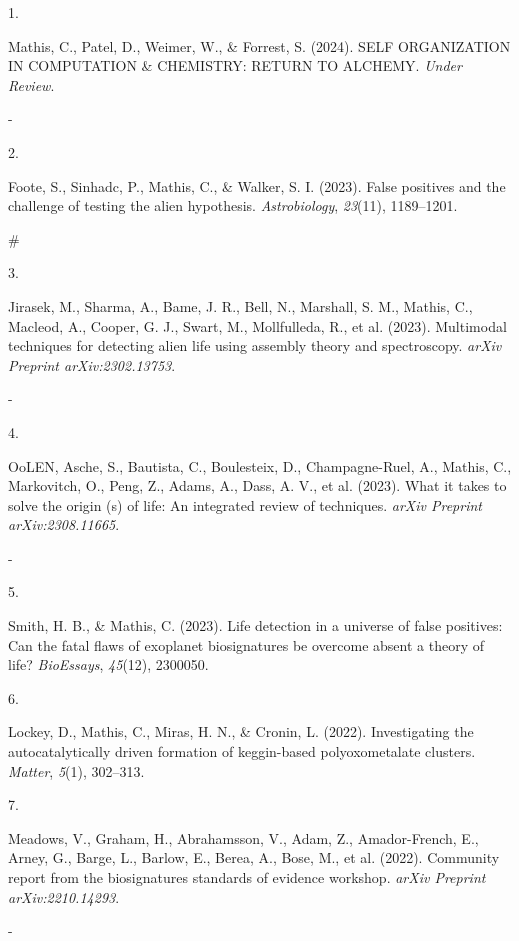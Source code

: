 \documentclass[11pt,a4paper,]{awesome-cv}
\newlength{\cslhangindent}
\newlength{\csllabelwidth}
\newenvironment{CSLReferences}[2] %
 {\begin{list}{}{%
  \setlength{\itemindent}{0pt}
  \setlength{\leftmargin}{0pt}
  \setlength{\parsep}{0pt}
  \ifodd #1
   \setlength{\leftmargin}{\cslhangindent}
   \setlength{\itemindent}{-1\cslhangindent}
  \fi
  \setlength{\itemsep}{#2\baselineskip}}}
 {\end{list}}
\newcommand{\CSLBlock}[1]{\hfill\break\parbox[t]{\linewidth}{\strut\ignorespaces#1\strut}}
\newcommand{\CSLLeftMargin}[1]{\parbox[t]{\csllabelwidth}{\strut#1\strut}}
\newcommand{\CSLRightInline}[1]{\parbox[t]{\linewidth - \csllabelwidth}{\strut#1\strut}}
\begin{document}
\label{refs-1797e7d470caf82193c45094f2f30c28}
\begin{CSLReferences}{0}{0}
\CSLLeftMargin{1. }%
\CSLRightInline{Mathis, C., Patel, D., Weimer, W., \& Forrest, S.
(2024). SELF ORGANIZATION IN COMPUTATION \& CHEMISTRY: RETURN TO
ALCHEMY. \emph{Under Review}.
\CSLBlock{-}}

\CSLLeftMargin{2. }%
\CSLRightInline{Foote, S., Sinhadc, P., Mathis, C., \& Walker, S. I.
(2023). False positives and the challenge of testing the alien
hypothesis. \emph{Astrobiology}, \emph{23}(11), 1189--1201.
\CSLBlock{\#}}

\CSLLeftMargin{3. }%
\CSLRightInline{Jirasek, M., Sharma, A., Bame, J. R., Bell, N.,
Marshall, S. M., Mathis, C., Macleod, A., Cooper, G. J., Swart, M.,
Mollfulleda, R., et al. (2023). Multimodal techniques for detecting
alien life using assembly theory and spectroscopy. \emph{arXiv Preprint
arXiv:2302.13753}.
\CSLBlock{-}}

\CSLLeftMargin{4. }%
\CSLRightInline{OoLEN, Asche, S., Bautista, C., Boulesteix, D.,
Champagne-Ruel, A., Mathis, C., Markovitch, O., Peng, Z., Adams, A.,
Dass, A. V., et al. (2023). What it takes to solve the origin (s) of
life: An integrated review of techniques. \emph{arXiv Preprint
arXiv:2308.11665}.
\CSLBlock{-}}

\CSLLeftMargin{5. }%
\CSLRightInline{Smith, H. B., \& Mathis, C. (2023). Life detection in a
universe of false positives: Can the fatal flaws of exoplanet
biosignatures be overcome absent a theory of life? \emph{BioEssays},
\emph{45}(12), 2300050.
\CSLBlock{*}}

\CSLLeftMargin{6. }%
\CSLRightInline{Lockey, D., Mathis, C., Miras, H. N., \& Cronin, L.
(2022). Investigating the autocatalytically driven formation of
keggin-based polyoxometalate clusters. \emph{Matter}, \emph{5}(1),
302--313.}

\CSLLeftMargin{7. }%
\CSLRightInline{Meadows, V., Graham, H., Abrahamsson, V., Adam, Z.,
Amador-French, E., Arney, G., Barge, L., Barlow, E., Berea, A., Bose,
M., et al. (2022). Community report from the biosignatures standards of
evidence workshop. \emph{arXiv Preprint arXiv:2210.14293}.
\CSLBlock{-}}


\end{CSLReferences}
\end{document}
